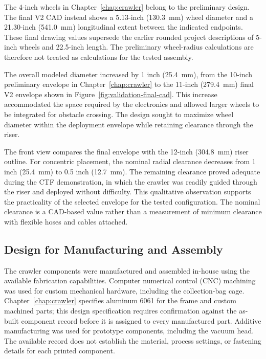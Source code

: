 The 4-inch wheels in Chapter~\ref{chap:crawler} belong to the preliminary design. The final V2 CAD instead shows a 5.13-inch (130.3~mm) wheel diameter and a 21.30-inch (541.0~mm) longitudinal extent between the indicated endpoints. These final drawing values supersede the earlier rounded project descriptions of 5-inch wheels and 22.5-inch length. The preliminary wheel-radius calculations are therefore not treated as calculations for the tested assembly.

The overall modeled diameter increased by 1 inch (25.4~mm), from the 10-inch preliminary envelope in Chapter~\ref{chap:crawler} to the 11-inch (279.4~mm) final V2 envelope shown in Figure~\ref{fig:validation-final-cad}. This increase accommodated the space required by the electronics and allowed larger wheels to be integrated for obstacle crossing. The design sought to maximize wheel diameter within the deployment envelope while retaining clearance through the riser.

The front view compares the final envelope with the 12-inch (304.8~mm) riser outline. For concentric placement, the nominal radial clearance decreases from 1 inch (25.4~mm) to 0.5 inch (12.7~mm). The remaining clearance proved adequate during the CTF demonstration, in which the crawler was readily guided through the riser and deployed without difficulty. This qualitative observation supports the practicality of the selected envelope for the tested configuration. The nominal clearance is a CAD-based value rather than a measurement of minimum clearance with flexible hoses and cables attached.

\subsection{Design for Manufacturing and Assembly}
\label{sec:prototype-manufacturing}
The crawler components were manufactured and assembled in-house using the available fabrication capabilities. Computer numerical control (CNC) machining was used for custom mechanical hardware, including the collection-bag cage. Chapter~\ref{chap:crawler} specifies aluminum 6061 for the frame and custom machined parts; this design specification requires confirmation against the as-built component record before it is assigned to every manufactured part. Additive manufacturing was used for prototype components, including the vacuum head. The available record does not establish the material, process settings, or fastening details for each printed component.

